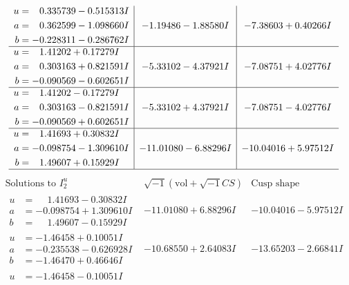 \documentclass[1p]{elsarticle_modified}
\theoremstyle{definition}
\newcommand{\I}{\sqrt{-1}}
\begin{document}
$$\begin{array}{c|c|c}
\begin{aligned}
u &= \phantom{-}0.335739 - 0.515313 I \\
a &= \phantom{-}0.362599 - 1.098660 I \\
b &= -0.228311 - 0.286762 I\end{aligned}
 & -1.19486 - 1.88580 I & -7.38603 + 0.40266 I \\ \hline\begin{aligned}
u &= \phantom{-}1.41202 + 0.17279 I \\
a &= \phantom{-}0.303163 + 0.821591 I \\
b &= -0.090569 - 0.602651 I\end{aligned}
 & -5.33102 - 4.37921 I & -7.08751 + 4.02776 I \\ \hline\begin{aligned}
u &= \phantom{-}1.41202 - 0.17279 I \\
a &= \phantom{-}0.303163 - 0.821591 I \\
b &= -0.090569 + 0.602651 I\end{aligned}
 & -5.33102 + 4.37921 I & -7.08751 - 4.02776 I \\ \hline\begin{aligned}
u &= \phantom{-}1.41693 + 0.30832 I \\
a &= -0.098754 - 1.309610 I \\
b &= \phantom{-}1.49607 + 0.15929 I\end{aligned}
 & -11.01080 - 6.88296 I & -10.04016 + 5.97512 I\\
 \hline 
 \end{array}$$\newpage$$\begin{array}{c|c|c}  
\text{Solutions to }I^u_{2}& \I (\text{vol} + \sqrt{-1}CS) & \text{Cusp shape}\\
 \hline 
\begin{aligned}
u &= \phantom{-}1.41693 - 0.30832 I \\
a &= -0.098754 + 1.309610 I \\
b &= \phantom{-}1.49607 - 0.15929 I\end{aligned}
 & -11.01080 + 6.88296 I & -10.04016 - 5.97512 I \\ \hline\begin{aligned}
u &= -1.46458 + 0.10051 I \\
a &= -0.235538 - 0.626928 I \\
b &= -1.46470 + 0.46646 I\end{aligned}
 & -10.68550 + 2.64083 I & -13.65203 - 2.66841 I \\ \hline\begin{aligned}
u &= -1.46458 - 0.10051 I \\

\end{aligned}
\end{array}$$
\end{document}
